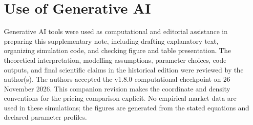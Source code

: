 \documentclass[11pt]{article}
\begin{document}
\section*{Use of Generative AI}

Generative AI tools were used as computational and editorial assistance in
preparing this supplementary note, including drafting explanatory text,
organizing simulation code, and checking figure and table presentation. The
theoretical interpretation, modelling assumptions, parameter choices, code
outputs, and final scientific claims in the historical edition were reviewed by the author(s). The authors accepted the v1.8.0 computational checkpoint on 26 November 2026. This companion revision makes the coordinate and density conventions for the pricing comparison explicit. No empirical market data are used in
these simulations; the figures are generated from the stated equations and
declared parameter profiles.
\end{document}
